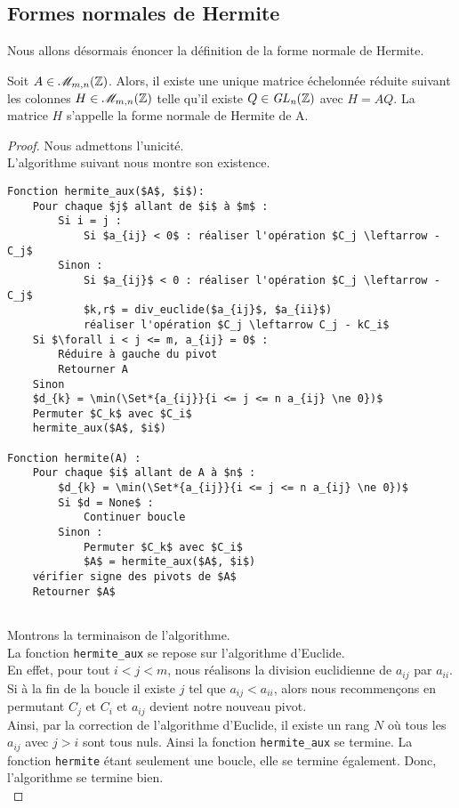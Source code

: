 \documentclass[12pt]{article}
\begin{document}
\subsection{Formes normales de Hermite}
Nous allons désormais énoncer la définition de la forme normale de Hermite.
\begin{definition}
	Soit $A \in \mathscr{M}_{m,n}(\mathbb Z)$. Alors, il existe une unique matrice échelonnée
	réduite suivant les colonnes $H \in \mathscr{M}_{m,n}(\mathbb Z)$ telle qu'il existe $Q \in \it {GL}_n(\mathbb Z)$
	avec $H = AQ$. La matrice $H$ s'appelle la forme normale de Hermite de A.
\end{definition}

\begin{proof}
	Nous admettons l'unicité.\\
	L'algorithme suivant nous montre son existence.
	\begin{lstlisting}
Fonction hermite_aux($A$, $i$):
	Pour chaque $j$ allant de $i$ à $m$ :
		Si i = j :
			Si $a_{ij} < 0$ : réaliser l'opération $C_j \leftarrow -C_j$
		Sinon :
			Si $a_{ij}$ < 0 : réaliser l'opération $C_j \leftarrow -C_j$
			$k,r$ = div_euclide($a_{ij}$, $a_{ii}$)
			réaliser l'opération $C_j \leftarrow C_j - kC_i$
	Si $\forall i < j <= m, a_{ij} = 0$ :
		Réduire à gauche du pivot
		Retourner A
	Sinon
	$d_{k} = \min(\Set*{a_{ij}}{i <= j <= n a_{ij} \ne 0})$
	Permuter $C_k$ avec $C_i$
	hermite_aux($A$, $i$)

Fonction hermite(A) :
	Pour chaque $i$ allant de A à $n$ :
		$d_{k} = \min(\Set*{a_{ij}}{i <= j <= n a_{ij} \ne 0})$
		Si $d = None$ :
			Continuer boucle
		Sinon :
			Permuter $C_k$ avec $C_i$
			$A$ = hermite_aux($A$, $i$)
	vérifier signe des pivots de $A$
	Retourner $A$


\end{lstlisting}
	\newpage\noindent
	Montrons la terminaison de l'algorithme.\\
	La fonction \texttt{hermite\_aux} se repose sur l'algorithme d'Euclide.\\
	En effet, pour tout $i < j < m$, nous réalisons la division euclidienne de $a_{ij}$ par $a_{ii}$.\\
	Si à la fin de la boucle il existe $j$ tel que $a_{ij} < a_{ii}$, alors nous recommençons
	en permutant $C_j$ et $C_i$ et $a_{ij}$ devient	notre nouveau pivot.\\
	Ainsi, par la correction de l'algorithme d'Euclide, il existe un rang $N$ où tous les
	$a_{ij}$ avec $j> i$ sont tous nuls. Ainsi la fonction \texttt{hermite\_aux} se termine.
	La fonction \texttt{hermite} étant	seulement une boucle, elle se termine également.
	Donc, l'algorithme se termine bien.\\


\end{proof}
\end{document}
